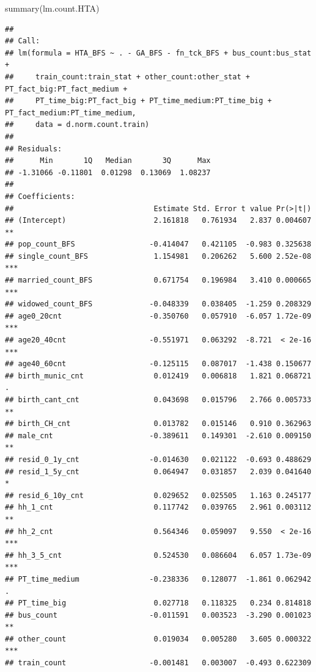 \documentclass[
]{article}
\newenvironment{Shaded}{\begin{snugshade}}{\end{snugshade}}
\newcommand{\FunctionTok}[1]{\textcolor[rgb]{0.00,0.00,0.00}{#1}}
\newcommand{\NormalTok}[1]{#1}
\begin{document}
\begin{Shaded}
\begin{Highlighting}[]
\FunctionTok{summary}\NormalTok{(lm.count.HTA)}
\end{Highlighting}
\end{Shaded}

\begin{verbatim}
## 
## Call:
## lm(formula = HTA_BFS ~ . - GA_BFS - fn_tck_BFS + bus_count:bus_stat + 
##     train_count:train_stat + other_count:other_stat + PT_fact_big:PT_fact_medium + 
##     PT_time_big:PT_fact_big + PT_time_medium:PT_time_big + PT_fact_medium:PT_time_medium, 
##     data = d.norm.count.train)
## 
## Residuals:
##      Min       1Q   Median       3Q      Max 
## -1.31066 -0.11801  0.01298  0.13069  1.08237 
## 
## Coefficients:
##                                Estimate Std. Error t value Pr(>|t|)    
## (Intercept)                    2.161818   0.761934   2.837 0.004607 ** 
## pop_count_BFS                 -0.414047   0.421105  -0.983 0.325638    
## single_count_BFS               1.154981   0.206262   5.600 2.52e-08 ***
## married_count_BFS              0.671754   0.196984   3.410 0.000665 ***
## widowed_count_BFS             -0.048339   0.038405  -1.259 0.208329    
## age0_20cnt                    -0.350760   0.057910  -6.057 1.72e-09 ***
## age20_40cnt                   -0.551971   0.063292  -8.721  < 2e-16 ***
## age40_60cnt                   -0.125115   0.087017  -1.438 0.150677    
## birth_munic_cnt                0.012419   0.006818   1.821 0.068721 .  
## birth_cant_cnt                 0.043698   0.015796   2.766 0.005733 ** 
## birth_CH_cnt                   0.013782   0.015146   0.910 0.362963    
## male_cnt                      -0.389611   0.149301  -2.610 0.009150 ** 
## resid_0_1y_cnt                -0.014630   0.021122  -0.693 0.488629    
## resid_1_5y_cnt                 0.064947   0.031857   2.039 0.041640 *  
## resid_6_10y_cnt                0.029652   0.025505   1.163 0.245177    
## hh_1_cnt                       0.117742   0.039765   2.961 0.003112 ** 
## hh_2_cnt                       0.564346   0.059097   9.550  < 2e-16 ***
## hh_3_5_cnt                     0.524530   0.086604   6.057 1.73e-09 ***
## PT_time_medium                -0.238336   0.128077  -1.861 0.062942 .  
## PT_time_big                    0.027718   0.118325   0.234 0.814818    
## bus_count                     -0.011591   0.003523  -3.290 0.001023 ** 
## other_count                    0.019034   0.005280   3.605 0.000322 ***
## train_count                   -0.001481   0.003007  -0.493 0.622309    

\end{verbatim}
\end{document}

